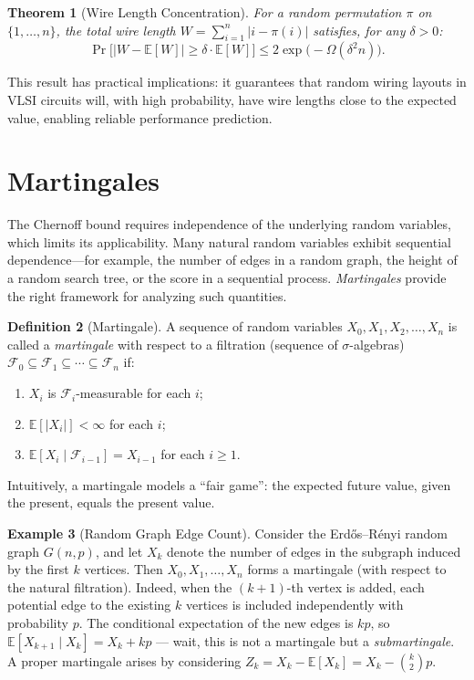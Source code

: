 \documentclass[twoside,12pt]{book}
\theoremstyle{plain}
\newtheorem{theorem}{Theorem}[chapter]
\theoremstyle{definition}
\newtheorem{definition}[theorem]{Definition}
\newtheorem{example}[theorem]{Example}
\theoremstyle{remark}
\begin{document}
\begin{theorem}[Wire Length Concentration]
\label{thm:wiring}
For a random permutation $\pi$ on $\{1, \ldots, n\}$, the total wire
length $W = \sum_{i=1}^{n} |i - \pi(i)|$ satisfies, for any $\delta > 0$:
\[
\Pr\!\bigl[|W - \mathbb{E}[W]| \geq \delta \cdot \mathbb{E}[W]\bigr]
\leq 2\exp\!\bigl(-\Omega(\delta^2 n)\bigr).
\]
\end{theorem}

This result has practical implications: it guarantees that random wiring
layouts in VLSI circuits will, with high probability, have wire lengths
close to the expected value, enabling reliable performance prediction.

\section{Martingales}
\label{sec:martingales}

The Chernoff bound requires independence of the underlying random
variables, which limits its applicability. Many natural random variables
exhibit sequential dependence---for example, the number of edges in a
random graph, the height of a random search tree, or the score in a
sequential process. \emph{Martingales} provide the right framework for
analyzing such quantities.

\begin{definition}[Martingale]
\label{def:martingale}
A sequence of random variables $X_0, X_1, X_2, \ldots, X_n$ is called a
\emph{martingale} with respect to a filtration (sequence of
$\sigma$-algebras) $\mathcal{F}_0 \subseteq \mathcal{F}_1 \subseteq
\cdots \subseteq \mathcal{F}_n$ if:
\begin{enumerate}[label=(\roman*)]
\item $X_i$ is $\mathcal{F}_i$-measurable for each $i$;
\item $\mathbb{E}[|X_i|] < \infty$ for each $i$;
\item $\mathbb{E}[X_i \mid \mathcal{F}_{i-1}] = X_{i-1}$ for each
      $i \geq 1$.
\end{enumerate}
Intuitively, a martingale models a ``fair game'': the expected future
value, given the present, equals the present value.
\end{definition}

\begin{example}[Random Graph Edge Count]
\label{ex:graph-martingale}
Consider the Erd\H{o}s--R\'{e}nyi random graph $G(n, p)$, and let $X_k$
denote the number of edges in the subgraph induced by the first $k$
vertices. Then $X_0, X_1, \ldots, X_n$ forms a martingale (with respect
to the natural filtration). Indeed, when the $(k+1)$-th vertex is added,
each potential edge to the existing $k$ vertices is included independently
with probability $p$. The conditional expectation of the new edges is
$kp$, so $\mathbb{E}[X_{k+1} \mid X_k] = X_k + kp$ --- wait, this is
not a martingale but a \emph{submartingale}. A proper martingale arises
by considering $Z_k = X_k - \mathbb{E}[X_k] = X_k - \binom{k}{2}p$.
\end{example}
\end{document}
